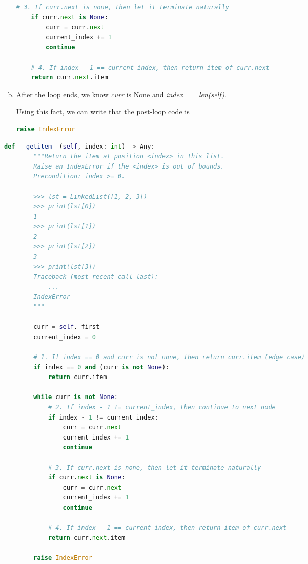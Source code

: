 \documentclass[12pt]{article}
\begin{document}
\begin{enumerate}[a.]
\begin{lstlisting}[language=Python]
    # 3. If curr.next is none, then let it terminate naturally
    if curr.next is None:
        curr = curr.next
        current_index += 1
        continue

    # 4. If index - 1 == current_index, then return item of curr.next
    return curr.next.item
    \end{lstlisting}

    \item

    After the loop ends, we know \textit{curr} is None and \textit{index == len(self)}.

    \bigskip

    Using this fact, we can write that the post-loop code is

    \begin{lstlisting}[language=Python]
    raise IndexError
    \end{lstlisting}

\end{enumerate}

\bigskip

\begin{lstlisting}[language=Python,caption={worksheet\_13\_q2\_solution.py},captionpos=b]
    def __getitem__(self, index: int) -> Any:
        """Return the item at position <index> in this list.
        Raise an IndexError if the <index> is out of bounds.
        Precondition: index >= 0.

        >>> lst = LinkedList([1, 2, 3])
        >>> print(lst[0])
        1
        >>> print(lst[1])
        2
        >>> print(lst[2])
        3
        >>> print(lst[3])
        Traceback (most recent call last):
            ...
        IndexError
        """

        curr = self._first
        current_index = 0

        # 1. If index == 0 and curr is not none, then return curr.item (edge case)
        if index == 0 and (curr is not None):
            return curr.item

        while curr is not None:
            # 2. If index - 1 != current_index, then continue to next node
            if index - 1 != current_index:
                curr = curr.next
                current_index += 1
                continue

            # 3. If curr.next is none, then let it terminate naturally
            if curr.next is None:
                curr = curr.next
                current_index += 1
                continue

            # 4. If index - 1 == current_index, then return item of curr.next
            return curr.next.item

        raise IndexError
\end{lstlisting}
\end{document}
